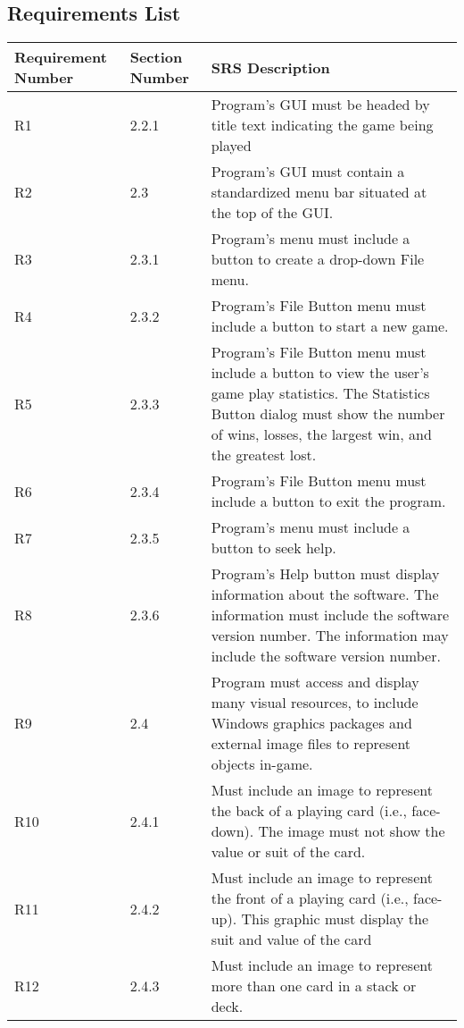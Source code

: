 \documentclass [landscape, 12pt] {article}
\begin{document}
 \subsection {Requirements List}
		 
		\begin {longtable}{p{4cm}p{3cm}p{10cm}}
			\hline\hline
			Requirement Number & Section Number & SRS Description \\[0.5ex]
			\hline
		
			R1 &  2.2.1 &  Program's GUI must be headed by title text indicating the game being played\\
			R2 & 2.3 & Program's GUI must contain a standardized menu bar situated at the top of the GUI. \\
			R3 & 2.3.1 & Program's menu must include a button to create a drop-down File menu.\\
			R4 & 2.3.2 & Program's File Button menu must include a button to start a new game.\\
			R5 & 2.3.3 & Program's File Button menu must include a button to view the user's game play statistics. The Statistics Button dialog must show the number of wins, losses, the largest win, and the greatest lost.\\
			R6 & 2.3.4 & Program's File Button menu must include a button to exit the program.\\
			R7 & 2.3.5 & Program's menu must include a button to seek help.\\
			R8 & 2.3.6 & Program's Help button must display information about the software.  The information must include the software version number.  The information may include the software version number.\\
			R9 & 2.4 & Program must access and display many visual resources, to include Windows graphics packages and external image files to represent objects in-game.\\
			R10 & 2.4.1 & Must include an image to represent the back of a playing card (i.e., face-down).  The image must not show the value or suit of the card. \\
			R11 & 2.4.2 & Must include an image to represent the front of a playing card (i.e., face-up).  This graphic must display the suit and value of the card \\
			R12 & 2.4.3 & Must include an image to represent more than one card in a stack or deck.  \\

\end{longtable}
\end{document}

